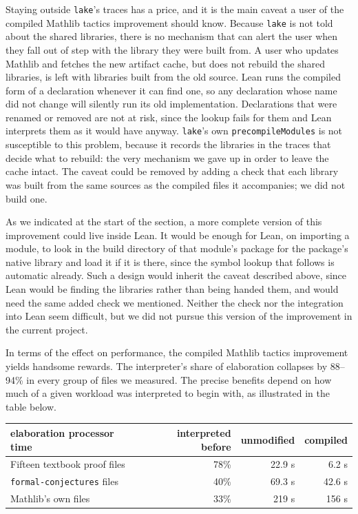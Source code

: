 \documentclass{article}
\newcommand{\Lean}{Lean\xspace}      %
\newcommand{\lake}{\texttt{lake}\xspace}      %
\newcommand{\mathlib}{Mathlib\xspace}
\begin{document}
Staying outside \lake's traces has a price, and it is the main caveat a user of the compiled \mathlib tactics improvement should know. Because \lake is not told about the shared libraries, there is no mechanism that can alert the user when they fall out of step with the library they were built from. A user who updates \mathlib and fetches the new artifact cache, but does not rebuild the shared libraries, is left with libraries built from the old source. \Lean runs the compiled form of a declaration whenever it can find one, so any declaration whose name did not change will silently run its old implementation. Declarations that were renamed or removed are not at risk, since the lookup fails for them and \Lean interprets them as it would have anyway. \lake's own \texttt{precompileModules} is not susceptible to this problem, because it records the libraries in the traces that decide what to rebuild: the very mechanism we gave up in order to leave the cache intact. The caveat could be removed by adding a check that each library was built from the same sources as the compiled files it accompanies; we did not build one.

As we indicated at the start of the section, a more complete version of this improvement could live inside \Lean. It would be enough for \Lean, on importing a module, to look in the build directory of that module's package for the package's native library and load it if it is there, since the symbol lookup that follows is automatic already. Such a design would inherit the caveat described above, since \Lean would be finding the libraries rather than being handed them, and would need the same added check we mentioned. Neither the check nor the integration into \Lean seem difficult, but we did not pursue this version of the improvement in the current project.

In terms of the effect on performance, the compiled \mathlib tactics improvement yields handsome rewards.
The interpreter's share of elaboration collapses by 88--94\% in every group of files we measured. The precise benefits depend on how much of a given workload was interpreted to begin with, as illustrated in the table below.

\begin{center}\small
\begin{tabular}{lrrr}
\toprule
elaboration processor time & interpreted before & unmodified & compiled \\
\midrule
Fifteen textbook proof files & 78\% & 22.9 s & 6.2 s \\
\texttt{formal-conjectures} files & 40\% & 69.3 s & 42.6 s \\
\mathlib's own files & 33\% & 219 s & 156 s \\
\bottomrule
\end{tabular}
\end{center}
\end{document}
